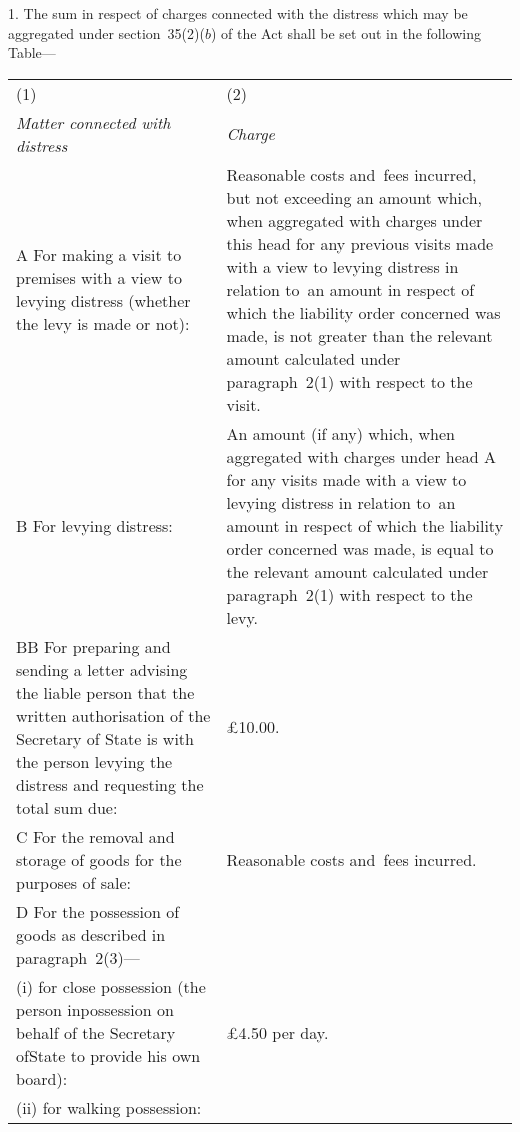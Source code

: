 \documentclass[12pt,a4paper]{article}
\begin{document}
\renewcommand\parthead{--- Schedule~2}

1.  The sum in respect of charges connected with the distress which may be aggregated under section~35(2)($b$) of the Act shall be set out in the following Table—

{\noindent\footnotesize
\begin{longtable}{p{183pt}p{183pt}}
\hline
(1)&(2)\\
\itshape Matter connected with distress&\itshape Charge\\
\hline
\endhead
\hline
\endlastfoot
A {} For making a visit to premises with a view to levying distress (whether the levy is made or not):&
Reasonable costs and~fees incurred, but not exceeding an amount which, when aggregated with charges under this head for any previous visits made with a view to levying distress in relation to~an amount in respect of which the liability order concerned was made, is not greater than the relevant amount calculated under paragraph~2(1) with respect to the visit.\\
B {} For levying distress:&
An amount (if any) which, when aggregated with charges under head A for any visits made with a view to levying distress in relation to~an amount in respect of which the liability order concerned was made, is equal to the relevant amount calculated under paragraph~2(1) with respect to the levy.\\
BB {} For preparing and sending a letter advising the liable person that the written authorisation of the Secretary of State is with the person levying the distress and requesting the total sum due: & £10$.$00.\\
C {} For the removal and storage of goods for the purposes of sale:&
Reasonable costs and~fees incurred.\\
D {}  For the possession of goods as described in paragraph~2(3)—\\
\hspace{12pt}(i) for close possession (the person in\linebreak\hspace*{12pt}possession on behalf of the Secretary of\linebreak\hspace*{12pt}State to provide his own board):&
£4$.$50 per day.\\
\hspace{12pt}(ii) for walking possession:&

\end{longtable}}
\end{document}
